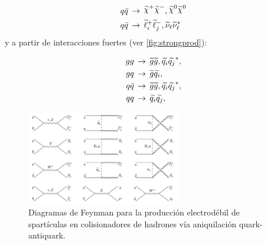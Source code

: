 \begin{align}
  &q\bar{q} \, \to \, \chinop \chinom, \nino \nino \label{eq:qq_ewk} \\
  &q\bar{q} \, \to \, \susy{\ell}^{+}_{i}\susy{\ell}^{-}_{j}, \susy{\nu}_{\ell}\susy{\nu}^{*}_{\ell} \label{eq:qq_ewk2}
\end{align}
%
y a partir de interacciones fuertes (ver \cref{fig:strongprod}):

\begin{align}
  gg \, &\rightarrow \, \widetilde{g}\widetilde{g}, \widetilde{q_i}\widetilde{q_j}^{*}, \label{eq:gg} \\
  gq \, &\rightarrow \, \widetilde{g}\widetilde{q_i}, \label{eq:gq} \\
  q\bar{q} \, &\rightarrow \, \widetilde{g}\widetilde{g}, \widetilde{q_i}\widetilde{q_j}^{*}, \label{eq:qqbar} \\
  qq \, &\rightarrow \, \widetilde{q_i}\widetilde{q_j}, \label{eq:qq}
\end{align}


\begin{figure}[!htb]
  \centering \includegraphics[width=0.6\textwidth]{figures/figure_101}
  \caption{Diagramas de Feynman para la producción electrodébil de spartículas
    en colisionadores de hadrones vía aniquilación quark-antiquark.}
  \label{fig:ewkprod}
\end{figure}

